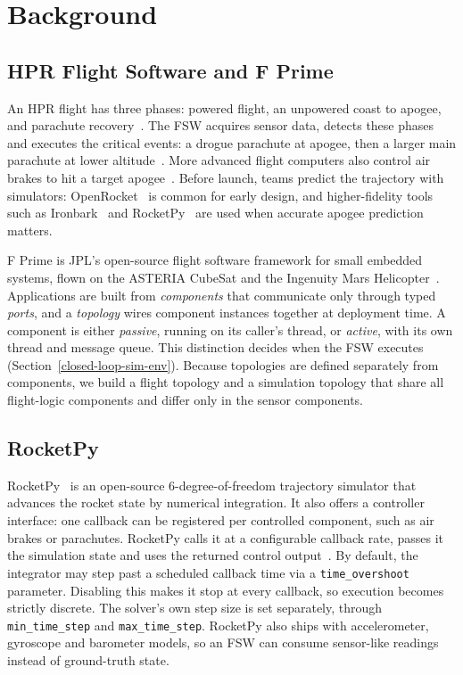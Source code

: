 \section{Background}\label{s:background}

\subsection{HPR Flight Software and F Prime}
An HPR flight has three phases: powered flight, an unpowered coast to apogee, and parachute recovery~\cite{rocketpy-ref}. The FSW acquires sensor data, detects these phases and executes the critical events: a drogue parachute at apogee, then a larger main parachute at lower altitude~\cite{clary2024georgia-tech-avionics, Jasztal-drogue-main-parachute}. More advanced flight computers also control air brakes to hit a target apogee~\cite{sophie-evaluation-various-airbrake}. Before launch, teams predict the trajectory with simulators: OpenRocket~\cite{niskanen2013openrocket} is common for early design, and higher-fidelity tools such as Ironbark~\cite{galletly2026ironbark} and RocketPy~\cite{rocketpy-ref} are used when accurate apogee prediction matters.

F Prime is JPL's open-source flight software framework for small embedded systems, flown on the ASTERIA CubeSat and the Ingenuity Mars Helicopter~\cite{canham2022fprime-mars-helicopter, bocchino2018fprime, bocchino2022fpp}. Applications are built from \emph{components} that communicate only through typed \emph{ports}, and a \emph{topology} wires component instances together at deployment time. A component is either \emph{passive}, running on its caller's thread, or \emph{active}, with its own thread and message queue. This distinction decides when the FSW executes (Section~\ref{closed-loop-sim-env}). Because topologies are defined separately from components, we build a flight topology and a simulation topology that share all flight-logic components and differ only in the sensor components.

\subsection{RocketPy}\label{background-rocketpy}
RocketPy~\cite{rocketpy-ref} is an open-source 6-degree-of-freedom trajectory simulator that advances the rocket state by numerical integration. It also offers a controller interface: one callback can be registered per controlled component, such as air brakes or parachutes. RocketPy calls it at a configurable callback rate, passes it the simulation state and uses the returned control output~\cite{soares2022rocketpy, rocketpy-docs-airbrakes}. By default, the integrator may step past a scheduled callback time via a \texttt{time\_overshoot} parameter. Disabling this makes it stop at every callback, so execution becomes strictly discrete. The solver's own step size is set separately, through \texttt{min\_time\_step} and \texttt{max\_time\_step}. RocketPy also ships with accelerometer, gyroscope and barometer models, so an FSW can consume sensor-like readings instead of ground-truth state.


